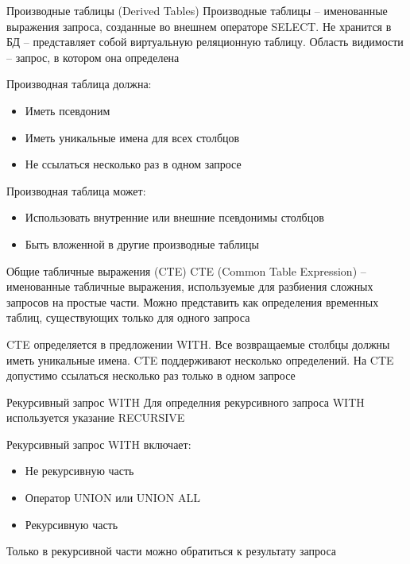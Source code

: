 \documentclass[12pt]{article}
\begin{document}
\begin{defin}{Производные таблицы (Derived Tables)}
    Производные таблицы -- именованные выражения запроса, созданные во внешнем операторе SELECT. Не хранится в БД -- представляет собой виртуальную реляционную таблицу. Область видимости -- запрос, в котором она определена 

    Производная таблица должна: 

    \begin{itemize}
        \item Иметь псевдоним
        \item Иметь уникальные имена для всех столбцов 
        \item Не ссылаться несколько раз в одном запросе 
    \end{itemize}

    Производная таблица может: 

    \begin{itemize}
        \item Использовать внутренние или внешние псевдонимы столбцов 
        \item Быть вложенной в другие производные таблицы 
    \end{itemize}
\end{defin}

\begin{defin}{Общие табличные выражения (CTE)}
    CTE (Common Table Expression) -- именованные табличные выражения, используемые для разбиения сложных запросов на простые части. Можно представить как определения временных таблиц, существующих только для одного запроса 

    CTE определяется в предложении WITH. Все возвращаемые столбцы должны иметь уникальные имена. CTE поддерживают несколько определений. На CTE допустимо ссылаться несколько раз только в одном запросе 
\end{defin}

\begin{defin}{Рекурсивный запрос WITH}
    Для определния рекурсивного запроса WITH используется указание RECURSIVE

    Рекурсивный запрос WITH включает: 

    \begin{itemize}
        \item Не рекурсивную часть 
        \item Оператор UNION или UNION ALL
        \item Рекурсивную часть
    \end{itemize}

    Только в рекурсивной части можно обратиться к результату запроса
\end{defin}
\end{document}
